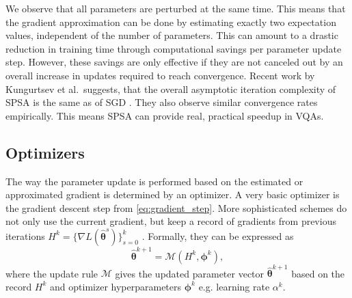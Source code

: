 We observe that all parameters are perturbed at the same time. This means that the gradient approximation can be done by estimating exactly two expectation values, independent of the number of parameters. This can amount to a drastic reduction in training time through computational savings per parameter update step. However, these savings are only effective if they are not canceled out by an overall increase in updates required to reach convergence. Recent work by Kungurtsev et al.\ suggests, that the overall asymptotic iteration complexity of \gls{SPSA} is the same as of \gls{SGD} \cite{Kungurtsev2022}. They also observe similar convergence rates empirically. This means \gls{SPSA} can provide real, practical speedup in \glspl{VQA}.

\subsection{Optimizers}
\label{sec:Optimizers}
The way the parameter update is performed based on the estimated or approximated gradient is determined by an optimizer. A very basic optimizer is the gradient descent step from \cref{eq:gradient_step}. More sophisticated schemes do not only use the current gradient, but keep a record of gradients from previous iterations $H^k = \{\nabla L(\hat{\bm{\theta}}^s)\}^k_{s=0}$ \cite{Choi19}.
Formally, they can be expressed as
\begin{equation}
    \hat{\bm{\theta}}^{k+1} = \mathcal{M}(H^k, \bm{\phi}^k),
\end{equation}
where the update rule $\mathcal{M}$ gives the updated parameter vector $\hat{\bm{\theta}}^{k+1}$ based on the record $H^k$ and optimizer hyperparameters $\bm{\phi}^k$ e.g. learning rate $\alpha^k$.

